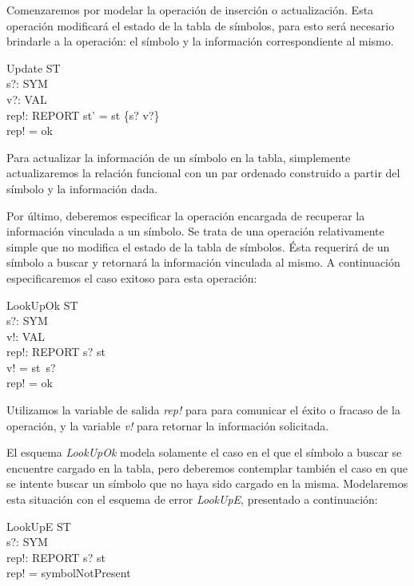 \bigskip
Comenzaremos por modelar la operación de inserción o actualización. Esta operación modificará el estado de la tabla de símbolos, para esto será necesario brindarle a la operación: el símbolo y la información correspondiente al mismo.

\begin{schema}{Update}
  \Delta ST \\
  s?: SYM \\
  v?: VAL \\
  rep!: REPORT
  \where
  st' = st \oplus \{s? \mapsto v?\} \\
  rep! = ok
\end{schema}


Para actualizar la información de un símbolo en la tabla, simplemente actualizaremos la relación funcional con un par ordenado construido a partir del símbolo y la información dada. 

Por último, deberemos especificar la operación encargada de recuperar la información vinculada a un símbolo. Se trata de una operación relativamente simple que no modifica el estado de la tabla de símbolos. Ésta requerirá de un símbolo a buscar y retornará la información vinculada al mismo. A continuación especificaremos el caso exitoso para esta operación:

\begin{schema}{LookUpOk}
\Xi ST \\
s?: SYM \\
v!: VAL \\
rep!: REPORT
\where
s? \in \dom st \\
v! = st~s? \\
rep! = ok
\end{schema} 

Utilizamos la variable de salida \emph{rep!} para para comunicar el éxito o fracaso de la operación, y la variable \emph{v!} para retornar la información solicitada. 

El esquema \emph{LookUpOk} modela solamente el caso en el que el símbolo a buscar se encuentre cargado en la tabla, pero deberemos contemplar también el caso en que se intente buscar un símbolo que no haya sido cargado en la misma. Modelaremos esta situación con el esquema de error \emph{LookUpE}, presentado a continuación:

\begin{schema}{LookUpE}
\Xi ST \\
s?: SYM \\
rep!: REPORT
\where
s? \notin \dom st \\
rep! = symbolNotPresent
\end{schema}

